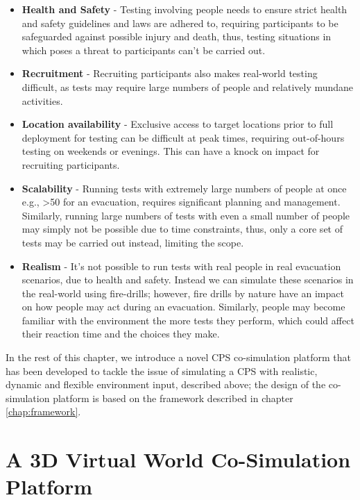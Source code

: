 \begin{itemize}
  \item \textbf{Health and Safety} - Testing involving people needs to ensure strict health and safety guidelines and laws are adhered to, requiring participants to be safeguarded against possible injury and death, thus, testing situations in which poses a threat to participants can't be carried out. 

  \item \textbf{Recruitment} - Recruiting participants also makes real-world testing difficult, as tests may require large numbers of people and relatively mundane activities. 

  \item \textbf{Location availability} - Exclusive access to target locations prior to full deployment for testing can be difficult at peak times, requiring out-of-hours testing on weekends or evenings. This can have a knock on impact for recruiting participants.

  \item \textbf{Scalability} - Running tests with extremely large numbers of people at once e.g., >50 for an evacuation, requires significant planning and management. Similarly, running large numbers of tests with even a small number of people may simply not be possible due to time constraints, thus, only a core set of tests may be carried out instead, limiting the scope.

  \item \textbf{Realism} - It's not possible to run tests with real people in real evacuation scenarios, due to health and safety. Instead we can simulate these scenarios in the real-world using fire-drills; however, fire drills by nature have an impact on how people may act during an evacuation. Similarly, people may become familiar with the environment the more tests they perform, which could affect their reaction time and the choices they make. 
\end{itemize}


In the rest of this chapter, we introduce a novel CPS co-simulation platform that has been developed to tackle the issue of simulating a CPS with realistic, dynamic and flexible environment input, described above; the design of the co-simulation platform is based on the framework described in chapter \ref{chap:framework}.


\section{A 3D Virtual World Co-Simulation Platform} %
\label{sec:a_3d_co_simulation_platform}

